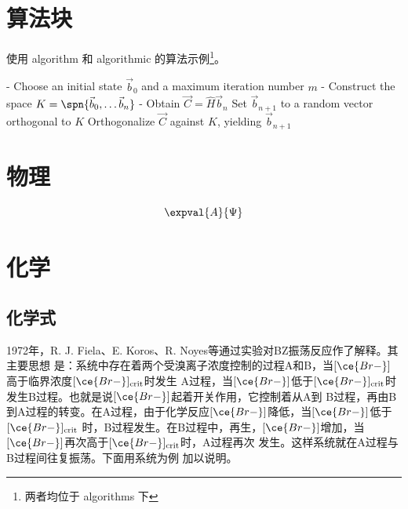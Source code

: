\section{算法块}

使用 {algorithm} 和 {algorithmic} 的算法示例\footnote{两者均位于 \textsf{algorithms} 下}。

\begin{algorithm}[htbp]
    \caption{Lanczos Algorithm}
    \begin{algorithmic}
        \STATE - Choose an initial state $\vec{b}_0$ and a maximum iteration number $m$
        \STATE - Construct the space $K = \spn\{\vec{b}_0 , \ldots \vec{b}_n \}$
        \STATE - Obtain $\vec{C} = \hat{H} \vec{b}_n$
        \STATE Set $\vec{b}_{n+1}$ to a random vector orthogonal to $K$
        \ELSE
        \STATE Orthogonalize $\vec{C}$ against $K$, yielding $\vec{b}_{n+1}$
        \ENDIF\ENDFOR
    \end{algorithmic}
\end{algorithm}


\section{物理}

\begin{equation}
    \expval{A}{\Psi}
\end{equation}


\section{化学}

\subsection{化学式}

1972年，R. J. Fiela、E. Koros、R. Noyes等通过实验对BZ振荡反应作了解释。其主要思想
是：系统中存在着两个受溴离子浓度控制的过程A和B，当$[\ce{Br-}]$高于临界浓度$[\ce{Br-}]_\text{crit}$时发生
A过程，当$[\ce{Br-}]$低于$[\ce{Br-}]_\text{crit}$时发生B过程。也就是说$[\ce{Br-}]$起着开关作用，它控制着从A到
B过程，再由B到A过程的转变。在A过程，由于化学反应$[\ce{Br-}]$降低，当$[\ce{Br-}]$低于$[\ce{Br-}]_\text{crit}$
时，B过程发生。在B过程中，再生，$[\ce{Br-}]$增加，当$[\ce{Br-}]$再次高于$[\ce{Br-}]_\text{crit}$时，A过程再次
发生。这样系统就在A过程与B过程间往复振荡。下面用系统为例
加以说明。\cite{qiujinhengetal2010}

